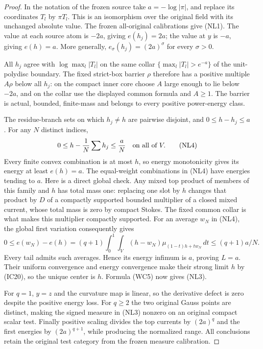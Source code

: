 \documentclass[11pt,a4paper]{article}
\numberwithin{equation}{section}
\theoremstyle{definition}
\theoremstyle{remark}
\begin{document}
\begin{proof}
In the notation of the frozen source take
$a=-\log|\pi|$, and replace its coordinates $T_l$ by $\pi T_l$.
This is an isomorphism over the original field with its unchanged
absolute value.  The frozen all-original calibrations give (NL1).
The value at each source atom is $-2a$, giving $e(h_j)=2a$;
the value at $y$ is $-a$, giving $e(h)=a$.  More generally,
$e_\sigma(h_j)=(2a)^\sigma$ for every $\sigma>0$.

All $h_j$ agree with $\log\max_l|T_l|$ on the same collar
$\{\max_l|T_l|>e^{-a}\}$ of the unit-polydisc boundary.
The fixed strict-box barrier $\rho$ therefore has a positive
multiple $A\rho$ below all $h_j$: on the compact inner core
choose $A$ large enough to lie below $-2a$, and on the collar
use the displayed common formula and $A\geq1$.
The barrier is actual, bounded, finite-mass and belongs to every
positive power-energy class.

The residue-branch sets on which $h_j\ne h$ are pairwise disjoint,
and $0\leq h-h_j\leq a$.  For any $N$ distinct indices,
\[
          0\leq h-\frac1N\sum h_j\leq\frac aN
                                      \quad\hbox{on all of }V.
 \tag{NL4}
\]
Every finite convex combination is at most $h$, so energy
monotonicity gives its energy at least $e(h)=a$.
The equal-weight combinations in (NL4) have energies tending to
$a$.  Here is a direct global check.  Any mixed top product of
members of this family and $h$ has total mass one: replacing
one slot by $h$ changes that product by $D$ of a compactly
supported bounded multiplier of a closed mixed current, whose
total mass is zero by compact Stokes.  The fixed common collar
is what makes this multiplier compactly supported.  For an average
$w_N$ in (NL4), the global first variation consequently gives
\[
 0\leq e(w_N)-e(h)
   =(q+1)\int_0^1\!\int_V(h-w_N)
              \mu_{(1-t)h+tw_N}\,dt
   \leq(q+1)a/N.
 \tag{NL5}
\]
Every tail admits such averages.  Hence its energy infimum is
$a$, proving $L=a$.  Their uniform convergence and energy
convergence make their strong limit $h$ by (IC20), so the
unique center is $h$.  Formula (WC5) now gives (NL3).

For $q=1$, $y=z$ and the curvature map is linear, so the
derivative defect is zero despite the positive energy loss.
For $q\geq2$ the two original Gauss points are distinct, making
the signed measure in (NL3) nonzero on an original compact scalar
test.  Finally positive scaling divides the top currents by
$(2a)^q$ and the first energies by $(2a)^{q+1}$, while producing
the normalized range.  All conclusions retain the original test
category from the frozen measure calibration.
\end{proof}
\end{document}
